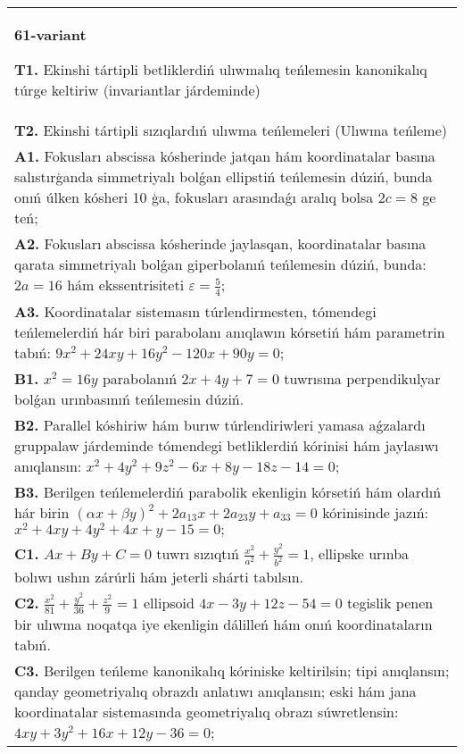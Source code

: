 \documentclass{article}
\begin{document}
\begin{tabular}{m{17cm}}
\textbf{61-variant}
\newline

\textbf{T1.} Ekinshi tártipli betliklerdiń ulıwmalıq teńlemesin kanonikalıq túrge keltiriw (invariantlar járdeminde) \\
\textbf{T2.} Ekinshi tártipli sızıqlardıń ulıwma teńlemeleri (Ulıwma teńleme) \\
\textbf{A1.} Fokusları abscissa kósherinde jatqan hám koordinatalar basına salıstırģanda simmetriyalı bolǵan ellipstiń teńlemesin dúziń, bunda onıń úlken kósheri 10 ģa, fokusları arasındaǵı aralıq bolsa $2c = 8$ ge teń; \\
\textbf{A2.} Fokusları abscissa kósherinde jaylasqan, koordinatalar basına qarata simmetriyalı bolǵan giperbolanıń teńlemesin dúziń, bunda: $2 a=16$ hám ekssentrisiteti $\varepsilon=\frac{5}{4}$; \\
\textbf{A3.} Koordinatalar sistemasın túrlendirmesten, tómendegi teńlemelerdiń hár biri parabolanı anıqlawın kórsetiń hám parametrin tabıń: $9 x^2+24 x y+16 y^2-120 x+90 y=0$; \\
\textbf{B1.} $x^2=16y$ parabolanıń $2x+4y+7=0$ tuwrısına perpendikulyar bolǵan urınbasınıń teńlemesin dúziń. \\
\textbf{B2.} Parallel kóshiriw hám burıw túrlendiriwleri yamasa aǵzalardı gruppalaw járdeminde tómendegi betliklerdiń kórinisi hám jaylasıwı anıqlansın: $x^2+4 y^2+9 z^2-6 x+8 y-18 z-14=0$; \\
\textbf{B3.} Berilgen teńlemelerdiń parabolik ekenligin kórsetiń hám olardıń hár birin $(\alpha x+\beta y)^2+2 a_{13} x+2 a_{23} y+a_{33}=0$ kórinisinde jazıń: $x^2+4 x y+4 y^2+4 x+y-15=0 ;$ \\
\textbf{C1.} $A x+B y+C=0$ tuwrı sızıqtıń $\frac{x^2}{a^2}+\frac{y^2}{b^2}=1$, ellipske urınba bolıwı ushın zárúrli hám jeterli shárti tabılsın. \\
\textbf{C2.} $\frac{x^2}{81}+\frac{y^2}{36}+\frac{z^2}{9}=1$ ellipsoid $4 x-3 y+12 z-54=0$ tegislik penen bir ulıwma noqatqa iye ekenligin dálilleń hám onıń koordinataların tabıń. \\
\textbf{C3.} Berilgen teńleme kanonikalıq kóriniske keltirilsin; tipi anıqlansın; qanday geometriyalıq obrazdı anlatıwı anıqlansın; eski hám jana koordinatalar sistemasında geometriyalıq obrazı súwretlensin: $4 x y+3 y^2+16 x+12 y-36=0$; \\

\end{tabular}
\vspace{1cm}
\end{document}
